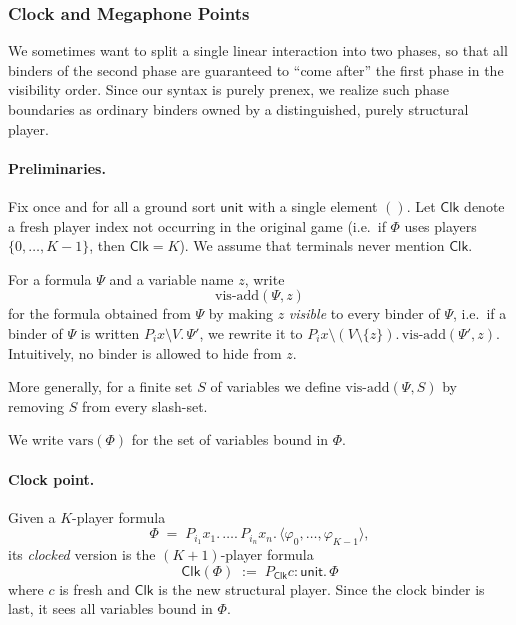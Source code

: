 \subsubsection{Clock and Megaphone Points}
\label{subsubsec:clock-megaphone}

We sometimes want to split a single linear interaction into two phases,
so that all binders of the second phase are guaranteed to ``come after''
the first phase in the visibility order. Since our syntax is purely
prenex, we realize such phase boundaries as ordinary binders owned by a
distinguished, purely structural player.

\paragraph{Preliminaries.}
Fix once and for all a ground sort $\mathsf{unit}$ with a single element
$()$. Let $\mathsf{Clk}$ denote a fresh player index not occurring in the
original game (i.e.\ if $\Phi$ uses players $\{0,\dots,K-1\}$, then
$\mathsf{Clk} = K$). We assume that terminals never mention $\mathsf{Clk}$.

For a formula $\Psi$ and a variable name $z$, write
\[
  \mathrm{vis\text{-}add}(\Psi,z)
\]
for the formula obtained from $\Psi$ by making $z$ \emph{visible} to
every binder of $\Psi$, i.e.\ if a binder of $\Psi$ is written
$P_i x \setminus V.\,\Psi'$, we rewrite it to
$P_i x \setminus (V \setminus \{z\}).\,\mathrm{vis\text{-}add}(\Psi',z)$.
Intuitively, no binder is allowed to hide from $z$.

More generally, for a finite set $S$ of variables we define
$\mathrm{vis\text{-}add}(\Psi,S)$ by removing $S$ from every slash-set.

We write $\mathrm{vars}(\Phi)$ for the set of variables bound in $\Phi$.

\paragraph{Clock point.}
Given a $K$-player formula
\[
  \Phi \;=\; P_{i_1} x_1.\, \dots.\, P_{i_n} x_n.\, \langle \varphi_0,\dots,\varphi_{K-1} \rangle,
\]
its \emph{clocked} version is the $(K+1)$-player formula
\[
  \mathsf{Clk}(\Phi)
  \;:=\;
  P_{\mathsf{Clk}} c : \mathsf{unit}.\, \Phi
\]
where $c$ is fresh and $\mathsf{Clk}$ is the new structural player.
Since the clock binder is last, it sees all variables bound in $\Phi$.

